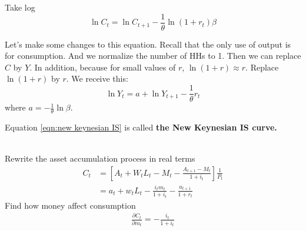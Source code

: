 \documentclass[12pt]{article}
\begin{document}
Take log
\begin{equation*}
\ln C_{t} = \ln C_{t + 1} - \frac{1}{\theta}\ln (1 + r_{t})\beta
\end{equation*}

Let's make some changes to this equation. Recall that the only use of output is for
consumption. And we normalize the number of HHs to 1. Then we can replace $ C $ by
$ Y $. In addition, because for small values of $ r $, $ \ln (1 + r)\approx r $. 
Replace $ \ln (1 + r) $ by $ r $. We receive this:
\begin{equation}
		\label{eqn:new keynesian IS}
\ln Y_{t} = a + \ln Y_{t + 1} - \frac{1}{\theta}r_{t}
\end{equation}
where $ a =  - \frac{1}{\theta}\ln \beta $.

Equation \eqref{eqn:new keynesian IS} is called {\textbf {the New Keynesian IS curve.}}


\noindent{}\\


Rewrite the asset accumulation process in real terms
\begin{align*}
C_{t}&= \left[ A_{t} + W_{t}L_{t} - M_{t} - \frac{A_{t + 1} - M_{t}}{1 + i_{t}} \right] 
\frac{1}{P_{t}}\\
&= a_{t} + w_{t}L_{t} - \frac{i_{t}m_{t}}{1 + i_{t}} - \frac{a_{t + 1}}{1 + r_{t}}
\end{align*}
Find how money affect consumption
\begin{align*}
\frac{\partial C_{t} }{\partial m_{t} } =  - \frac{i_{t}}{1 + i_{t}}
\end{align*}
\end{document}
